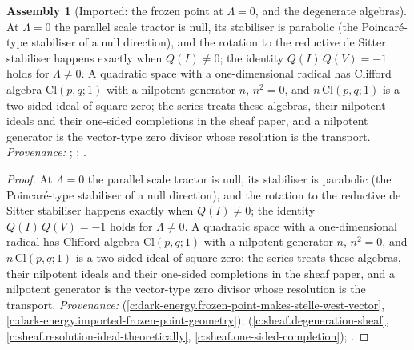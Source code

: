 \documentclass[11pt]{article}
\theoremstyle{definition}
\newtheorem{assembled}[theorem]{Assembly}
\theoremstyle{plain}
\newcommand{\changedmark}[2]{\marginpar{\raggedright\scriptsize\color{#1}#2}}
\providecommand{\Cl}{}\renewcommand{\Cl}{\mathrm{Cl}}
\begin{document}
\begin{assembled}[Imported: the frozen point at $\Lambda = 0$, and the degenerate algebras]\label{c:odd-extensions.imported-frozen-point-degenerate-algebras}
\changedmark{gray}{reworded}
At $\Lambda = 0$ the parallel scale tractor is null, its stabiliser is parabolic (the Poincar\'e-type stabiliser of a null direction), and the rotation to the reductive de Sitter stabiliser happens exactly when $Q(I) \neq 0$; the identity $Q(I)\,Q(V) = -1$ holds for $\Lambda \neq 0$. A quadratic space with a one-dimensional radical has Clifford algebra $\Cl(p,q;1)$ with a nilpotent generator $n$, $n^{2} = 0$, and $n\,\Cl(p,q;1)$ is a two-sided ideal of square zero; the series treats these algebras, their nilpotent ideals and their one-sided completions in the sheaf paper, and a nilpotent generator is the vector-type zero divisor whose resolution is the transport. \emph{Provenance:} \cite[Fact~2.1, Thm.~3.1]{ButlerT10}; \cite[Thm.~3.1, Prop.~3.4, Thm.~4.4]{ButlerT4}; \cite[\S 4]{ButlerT1}.
\end{assembled}
\begin{proof}
At $\Lambda = 0$ the parallel scale tractor is null, its stabiliser is parabolic (the Poincar\'e-type stabiliser of a null direction), and the rotation to the reductive de Sitter stabiliser happens exactly when $Q(I) \neq 0$; the identity $Q(I)\,Q(V) = -1$ holds for $\Lambda \neq 0$. A quadratic space with a one-dimensional radical has Clifford algebra $\Cl(p,q;1)$ with a nilpotent generator $n$, $n^{2} = 0$, and $n\,\Cl(p,q;1)$ is a two-sided ideal of square zero; the series treats these algebras, their nilpotent ideals and their one-sided completions in the sheaf paper, and a nilpotent generator is the vector-type zero divisor whose resolution is the transport. \emph{Provenance:} \cite[Fact~2.1, Thm.~3.1]{ButlerT10} (\ref{c:dark-energy.frozen-point-makes-stelle-west-vector}, \ref{c:dark-energy.imported-frozen-point-geometry}); \cite[Thm.~3.1, Prop.~3.4, Thm.~4.4]{ButlerT4} (\ref{c:sheaf.degeneration-sheaf}, \ref{c:sheaf.resolution-ideal-theoretically}, \ref{c:sheaf.one-sided-completion}); \cite[\S 4]{ButlerT1}.

\end{proof}
\end{document}
